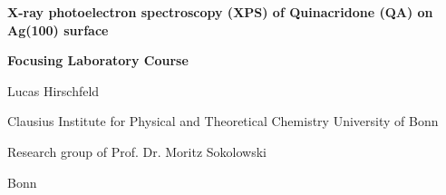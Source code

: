 \begin{titlepage}
	\centering
	{\scshape\LARGE \par}
	\vspace{1cm}
	{\huge\bfseries \textsf{X-ray photoelectron spectroscopy (XPS) of Quinacridone (QA) on Ag(100) surface}\par}
	\vspace{3 cm}
	{\Large\bfseries Focusing Laboratory Course \par}
	\vspace{3cm}
    {\large Lucas Hirschfeld\par}
	\vspace{3cm}
    {\large Clausius Institute for Physical and Theoretical Chemistry
	University of Bonn\par}
	\vspace{2.5cm}
    {\large Research group of Prof. Dr. Moritz Sokolowski\par}
	
	\vfill
	{\large Bonn
	\the\year{}}
\end{titlepage}


\cleardoublepage

\thispagestyle{empty}
\tableofcontents
\cleardoublepage